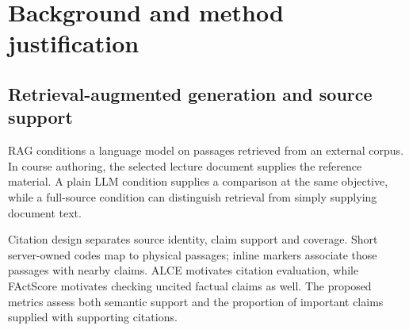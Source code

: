 \clearpage\section{Background and method justification}\label{sec:background}
\subsection{Retrieval-augmented generation and source support}
RAG conditions a language model on passages retrieved from an external corpus\citep{rag}. In course authoring, the selected lecture document supplies the reference material. A plain LLM condition supplies a comparison at the same objective, while a full-source condition can distinguish retrieval from simply supplying document text.

Citation design separates source identity, claim support and coverage. Short server-owned codes map to physical passages; inline markers associate those passages with nearby claims. ALCE motivates citation evaluation\citep{alce}, while FActScore motivates checking uncited factual claims as well\citep{factscore}. The proposed metrics assess both semantic support and the proportion of important claims supplied with supporting citations.
